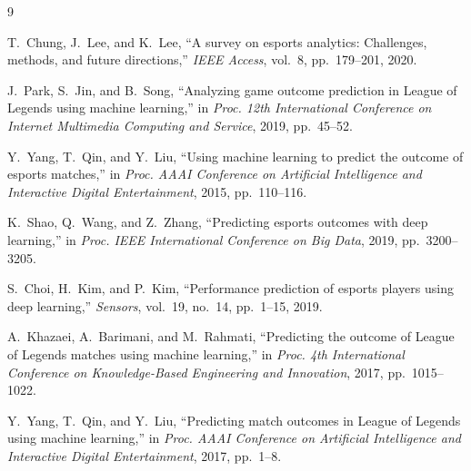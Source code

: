 \documentclass[runningheads]{llncs}
\begin{document}
\begin{thebibliography}{9}

T.~Chung, J.~Lee, and K.~Lee, ``A survey on esports analytics: Challenges, methods, and future directions,'' \emph{IEEE Access}, vol.~8, pp.~179--201, 2020.

J.~Park, S.~Jin, and B.~Song, ``Analyzing game outcome prediction in League of Legends using machine learning,'' in \emph{Proc. 12th International Conference on Internet Multimedia Computing and Service}, 2019, pp.~45--52.

Y.~Yang, T.~Qin, and Y.~Liu, ``Using machine learning to predict the outcome of esports matches,'' in \emph{Proc. AAAI Conference on Artificial Intelligence and Interactive Digital Entertainment}, 2015, pp.~110--116.

K.~Shao, Q.~Wang, and Z.~Zhang, ``Predicting esports outcomes with deep learning,'' in \emph{Proc. IEEE International Conference on Big Data}, 2019, pp.~3200--3205.

S.~Choi, H.~Kim, and P.~Kim, ``Performance prediction of esports players using deep learning,'' \emph{Sensors}, vol.~19, no.~14, pp.~1--15, 2019.

A.~Khazaei, A.~Barimani, and M.~Rahmati, ``Predicting the outcome of League of Legends matches using machine learning,'' in \emph{Proc. 4th International Conference on Knowledge-Based Engineering and Innovation}, 2017, pp.~1015--1022.

Y.~Yang, T.~Qin, and Y.~Liu, ``Predicting match outcomes in League of Legends using machine learning,'' in \emph{Proc. AAAI Conference on Artificial Intelligence and Interactive Digital Entertainment}, 2017, pp.~1--8.

\end{thebibliography}
\end{document}
